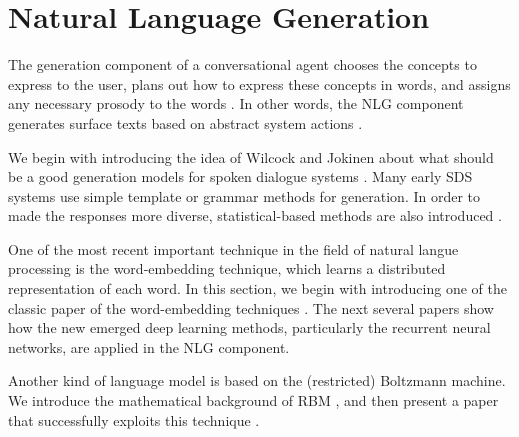 \section{Natural Language Generation}

The generation component of a conversational agent chooses the concepts to express to the user, plans out how to express these concepts in words, and assigns any necessary prosody to the words \cite{Jurafsky2006}. In other words, the NLG component generates surface texts based on abstract system actions \cite{Wen2015a}.

We begin with introducing the idea of Wilcock and Jokinen about what should be a good generation models for spoken dialogue systems \cite{wilcock2003}. Many early SDS systems use simple template or grammar methods for generation. In order to made the responses more diverse, statistical-based methods are also introduced \cite{Oh2000}.

One of the most recent important technique in the field of natural langue processing is the word-embedding technique, which learns a distributed representation of each word. In this section, we begin with introducing one of the classic paper of the word-embedding techniques \cite{Bengio2003A}. The next several papers \cite{Wen2015Stochastic, Martens2011, Mikolov2010} show how the new emerged deep learning methods, particularly the recurrent neural networks, are applied in the NLG component.
 
Another kind of language model is based on the (restricted) Boltzmann machine. We introduce the mathematical background of RBM \cite{Bengio2009}, and then present a paper that successfully exploits this technique \cite{Mnih2007}. %









